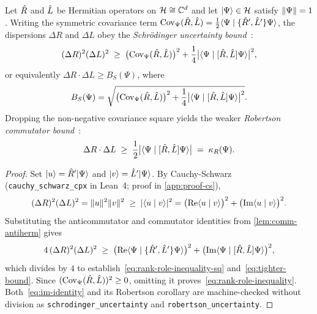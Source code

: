 \begin{theorem}
\label{thm:rank-role-inequality}
Let $\hat{R}$ and $\hat{L}$ be Hermitian operators on $\mathcal{H} \cong \mathbb{C}^d$ and let
$\lvert \Psi \rangle \in \mathcal{H}$ satisfy $\lVert \Psi \rVert = 1$. Writing the symmetric covariance
term $\mathrm{Cov}_{\Psi}(\hat{R},\hat{L}) = \frac{1}{2}\langle \Psi \mid \{\hat{R}',\hat{L}'\}\Psi \rangle$, the
dispersions $\Delta R$ and $\Delta L$ obey the \emph{Schr\"odinger uncertainty bound}~\citep{schrodinger1930unscharfeprinzip}:
\begin{equation}
  (\Delta R)^2 (\Delta L)^2
  \;\ge\; \bigl(\mathrm{Cov}_{\Psi}(\hat{R},\hat{L})\bigr)^2
  + \frac{1}{4}\bigl\lvert \langle \Psi \mid [\hat{R}, \hat{L}]\Psi \rangle \bigr\rvert^2,
  \label{eq:rank-role-inequality-sq}
\end{equation}
or equivalently $\Delta R \cdot \Delta L \ge B_S(\Psi)$, where
\begin{equation}
  B_S(\Psi) = \sqrt{\bigl(\mathrm{Cov}_{\Psi}(\hat{R},\hat{L})\bigr)^2
  + \frac{1}{4}\bigl\lvert \langle \Psi \mid [\hat{R}, \hat{L}]\Psi \rangle \bigr\rvert^2}.
  \label{eq:tighter-bound}
\end{equation}
Dropping the non-negative covariance square yields the weaker \emph{Robertson commutator
bound}~\citep{robertson1929uncertainty}:
\begin{equation}
  \Delta R \cdot \Delta L
  \;\ge\; \frac{1}{2}\bigl\lvert \langle \Psi \mid [\hat{R}, \hat{L}]\Psi \rangle \bigr\rvert
  \;=\; \kappa_R(\Psi).
  \label{eq:rank-role-inequality}
\end{equation}
\end{theorem}
\begin{proof}
Set $\lvert u \rangle = \hat{R}'\lvert \Psi \rangle$ and $\lvert v \rangle = \hat{L}'\lvert \Psi \rangle$. By Cauchy-Schwarz
(\texttt{cauchy\_schwarz\_cpx} in Lean~4; proof in \cref{app:proof-cs}),
\begin{equation}
  (\Delta R)^2 (\Delta L)^2
  = \lVert u \rVert^2 \lVert v \rVert^2
  \;\ge\; \lvert \langle u \mid v \rangle \rvert^2
  = \bigl(\operatorname{Re}\langle u \mid v \rangle\bigr)^2 + \bigl(\operatorname{Im}\langle u \mid v \rangle\bigr)^2.
  \label{eq:cs-step}
\end{equation}
Substituting the anticommutator and commutator identities from \cref{lem:comm-antiherm}
gives
\begin{equation}
  4\,(\Delta R)^2(\Delta L)^2
  \;\ge\; \bigl(\operatorname{Re}\langle \Psi \mid \{\hat{R}',\hat{L}'\}\Psi \rangle\bigr)^2
  + \bigl(\operatorname{Im}\langle \Psi \mid [\hat{R}, \hat{L}]\Psi \rangle\bigr)^2,
  \label{eq:im-identity}
\end{equation}
which divides by $4$ to establish~\eqref{eq:rank-role-inequality-sq} and~\eqref{eq:tighter-bound}.
Since $(\mathrm{Cov}_\Psi(\hat{R},\hat{L}))^2 \ge 0$, omitting it proves~\eqref{eq:rank-role-inequality}.
Both~\eqref{eq:im-identity} and its Robertson corollary are machine-checked without division
as \texttt{schrodinger\_\allowbreak{}uncertainty} and \texttt{robertson\_\allowbreak{}uncertainty}.
\end{proof}

